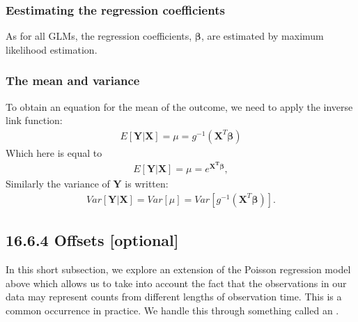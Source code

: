 \documentclass[letterpaper,10pt,english]{jupyterBook}
\begin{document}
\subsubsection{Eestimating the regression coefficients}
\label{\detokenize{16.g. Generalised Linear Model (GLM):eestimating-the-regression-coefficients}}
\sphinxAtStartPar
As for all GLMs, the regression coefficients, \(\mathbf{\beta}\), are estimated by maximum likelihood estimation.


\subsubsection{The mean and variance}
\label{\detokenize{16.g. Generalised Linear Model (GLM):the-mean-and-variance}}
\sphinxAtStartPar
To obtain an equation for the mean of the outcome, we need to apply the inverse link function:
\begin{equation*}
\begin{split}
E[\mathbf{Y}|\mathbf{X}] = \mu = g^{-1} (\mathbf{X}^T\mathbf{\beta})
\end{split}
\end{equation*}
\sphinxAtStartPar
Which here is equal to
\begin{equation*}
\begin{split}
E[\mathbf{Y}|\mathbf{X}]  = \mu = e^{\mathbf{X^T\beta}},
\end{split}
\end{equation*}
\sphinxAtStartPar
Similarly the variance of \(\mathbf{Y}\)  is written:
\begin{equation*}
\begin{split} 
Var[\mathbf{Y}|\mathbf{X}] = Var[\mu] =Var[ g^{-1} (\mathbf{X}^T\mathbf{\beta})].
\end{split}
\end{equation*}

\subsection{16.6.4 Offsets  {[}optional{]}}
\label{\detokenize{16.g. Generalised Linear Model (GLM):offsets-optional}}
\sphinxAtStartPar
In this short sub\sphinxhyphen{}section, we explore an extension of the Poisson regression model above which allows us to take into account the fact that the observations in our data may represent counts from different lengths of observation time. This is a common occurrence in practice. We handle this through something called an .
\end{document}
